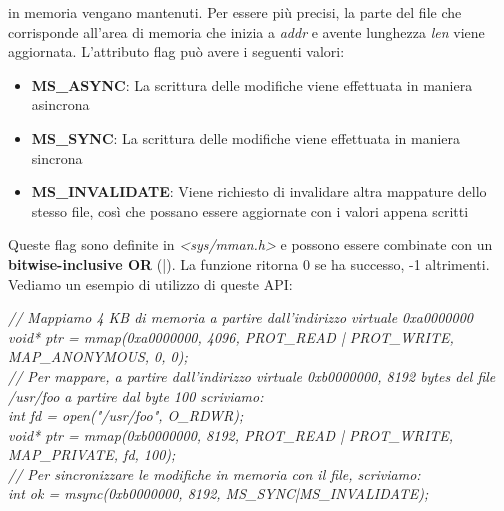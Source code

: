 \documentclass[12pt]{article}
\begin{document}
in memoria vengano mantenuti. Per essere più precisi, la parte del file che corrisponde all'area di memoria che
inizia a \textit{addr} e avente lunghezza \textit{len} viene aggiornata. L'attributo flag può avere i seguenti valori:
\begin{itemize}
    \item \textbf{MS\_ASYNC}: La scrittura delle modifiche viene effettuata in maniera asincrona
    \item \textbf{MS\_SYNC}: La scrittura delle modifiche viene effettuata in maniera sincrona
    \item \textbf{MS\_INVALIDATE}: Viene richiesto di invalidare altra mappature dello stesso file, così che possano essere aggiornate con i valori appena scritti
\end{itemize}
Queste flag sono definite in \textit{<sys/mman.h>} e possono essere combinate con un \textbf{bitwise-inclusive OR} (|).
La funzione ritorna 0 se ha successo, -1 altrimenti.
Vediamo un esempio di utilizzo di queste API:
\begin{center}
    \textit{// Mappiamo 4 KB di memoria a partire dall'indirizzo virtuale 0xa0000000} \\
    \textit{void* ptr = mmap(0xa0000000, 4096, PROT\_READ | PROT\_WRITE, MAP\_ANONYMOUS, 0, 0);} \\
    \textit{// Per mappare, a partire dall'indirizzo virtuale 0xb0000000, 8192 bytes del file /usr/foo a partire dal byte 100 scriviamo:} \\
    \textit{int fd = open("/usr/foo", O\_RDWR);} \\
    \textit{void* ptr = mmap(0xb0000000, 8192, PROT\_READ | PROT\_WRITE, MAP\_PRIVATE, fd, 100);} \\
    \textit{// Per sincronizzare le modifiche in memoria con il file, scriviamo:} \\
    \textit{int ok = msync(0xb0000000, 8192, MS\_SYNC|MS\_INVALIDATE);}
\end{center}
\end{document}
